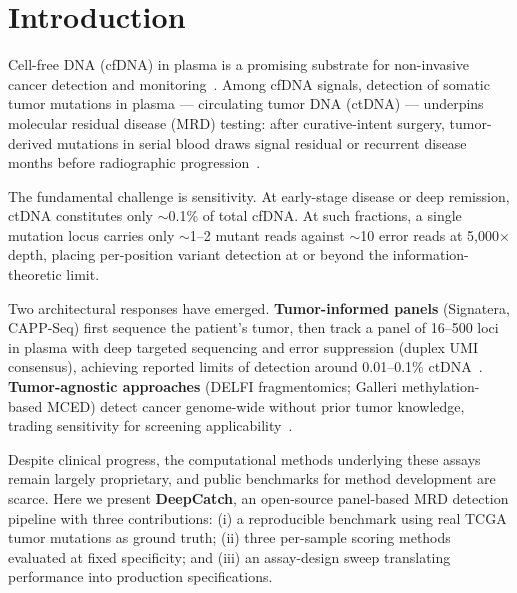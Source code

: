 \documentclass[11pt]{article}
\begin{document}
\begin{abstract}
\textbf{Conclusions.} DeepCatch provides a reproducible, honest benchmark for ultra-sensitive MRD detection using open-access data. The assay sweep yields concrete production specifications: duplex-UMI error suppression and $\sim$50,000$\times$ depth suffice for AUC 1.000 at 0.1\% ctDNA. Clinical validation on real plasma cfDNA remains the essential next step.

\textbf{Keywords:} cfDNA; ctDNA; MRD; liquid biopsy; early cancer detection; panel-based detection; duplex sequencing; open science
\end{abstract}

\section{Introduction}
\label{sec:intro}

Cell-free DNA (cfDNA) in plasma is a promising substrate for non-invasive cancer detection and monitoring~\cite{wan2017, bettegowa2014, lo1997}. Among cfDNA signals, detection of somatic tumor mutations in plasma --- circulating tumor DNA (ctDNA) --- underpins molecular residual disease (MRD) testing: after curative-intent surgery, tumor-derived mutations in serial blood draws signal residual or recurrent disease months before radiographic progression~\cite{reiner2019, tie2016, abbosh2017}.

The fundamental challenge is sensitivity. At early-stage disease or deep remission, ctDNA constitutes only $\sim$0.1\% of total cfDNA. At such fractions, a single mutation locus carries only $\sim$1--2 mutant reads against $\sim$10 error reads at 5,000$\times$ depth, placing per-position variant detection at or beyond the information-theoretic limit.

Two architectural responses have emerged. \textbf{Tumor-informed panels} (Signatera, CAPP-Seq) first sequence the patient's tumor, then track a panel of 16--500 loci in plasma with deep targeted sequencing and error suppression (duplex UMI consensus), achieving reported limits of detection around 0.01--0.1\% ctDNA~\cite{newman2014, newman2016, kennedy2014}. \textbf{Tumor-agnostic approaches} (DELFI fragmentomics; Galleri methylation-based MCED) detect cancer genome-wide without prior tumor knowledge, trading sensitivity for screening applicability~\cite{cristiano2019, liu2020}.

Despite clinical progress, the computational methods underlying these assays remain largely proprietary, and public benchmarks for method development are scarce. Here we present \textbf{DeepCatch}, an open-source panel-based MRD detection pipeline with three contributions: (i) a reproducible benchmark using real TCGA tumor mutations as ground truth; (ii) three per-sample scoring methods evaluated at fixed specificity; and (iii) an assay-design sweep translating performance into production specifications.
\end{document}
